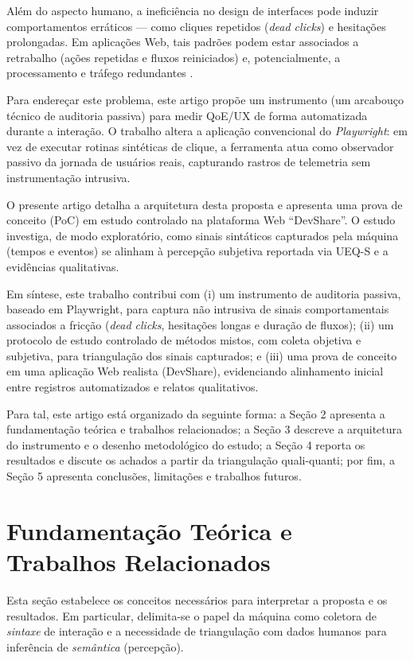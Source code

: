 \documentclass[12pt]{article}
\begin{document}
Além do aspecto humano, a ineficiência no design de interfaces pode induzir comportamentos erráticos --- como cliques repetidos (\textit{dead clicks}) e hesitações prolongadas. Em aplicações Web, tais padrões podem estar associados a retrabalho (ações repetidas e fluxos reiniciados) e, potencialmente, a processamento e tráfego redundantes \cite{oyedeji2019,rani2024}.

Para endereçar este problema, este artigo propõe um instrumento (um arcabouço técnico de auditoria passiva) para medir QoE/UX de forma automatizada durante a interação. O trabalho altera a aplicação convencional do \textit{Playwright}: em vez de executar rotinas sintéticas de clique, a ferramenta atua como observador passivo da jornada de usuários reais, capturando rastros de telemetria sem instrumentação intrusiva.

O presente artigo detalha a arquitetura desta proposta e apresenta uma prova de conceito (PoC) em estudo controlado na plataforma Web ``DevShare''. O estudo investiga, de modo exploratório, como sinais sintáticos capturados pela máquina (tempos e eventos) \cite{rousi2019} se alinham à percepção subjetiva reportada via UEQ-S e a evidências qualitativas.

Em síntese, este trabalho contribui com (i) um instrumento de auditoria passiva, baseado em Playwright, para captura não intrusiva de sinais comportamentais associados a fricção (\textit{dead clicks}, hesitações longas e duração de fluxos); (ii) um protocolo de estudo controlado de métodos mistos, com coleta objetiva e subjetiva, para triangulação dos sinais capturados; e (iii) uma prova de conceito em uma aplicação Web realista (DevShare), evidenciando alinhamento inicial entre registros automatizados e relatos qualitativos.

Para tal, este artigo está organizado da seguinte forma: a Seção 2 apresenta a fundamentação teórica e trabalhos relacionados; a Seção 3 descreve a arquitetura do instrumento e o desenho metodológico do estudo; a Seção 4 reporta os resultados e discute os achados a partir da triangulação quali-quanti; por fim, a Seção 5 apresenta conclusões, limitações e trabalhos futuros.

\section{Fundamentação Teórica e Trabalhos Relacionados}

Esta seção estabelece os conceitos necessários para interpretar a proposta e os resultados. Em particular, delimita-se o papel da máquina como coletora de \textit{sintaxe} de interação e a necessidade de triangulação com dados humanos para inferência de \textit{semântica} (percepção).
\end{document}
